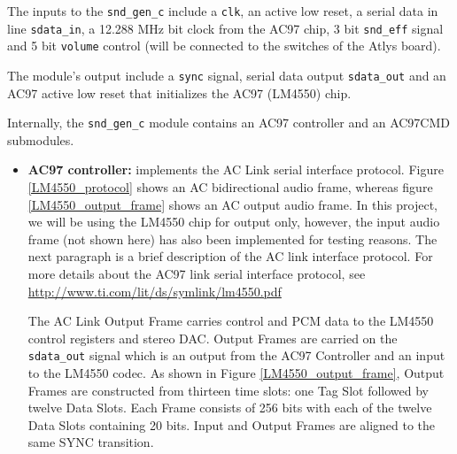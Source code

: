 				The inputs to the \texttt{snd\_gen\_c} include a \texttt{clk}, an active low reset, a serial data in line \texttt{sdata\_in}, a 12.288 MHz bit clock from the AC97 chip, 3 bit \texttt{snd\_eff} signal and 5 bit \texttt{volume} control (will be connected to the switches of the Atlys board).
				
				The module's output include a \texttt{sync} signal, serial data output \texttt{sdata\_out} and an AC97 active low reset that initializes the AC97 (LM4550) chip. 
				
				Internally, the \texttt{snd\_gen\_c} module contains an AC97 controller and an AC97CMD submodules.
				\begin{itemize}
				\item \textbf{AC97 controller:} implements the AC Link serial interface protocol. Figure \ref{LM4550_protocol} shows an AC bidirectional audio frame, whereas figure \ref{LM4550_output_frame} shows an AC output audio frame. In this project, we will be using the LM4550 chip for output only, however, the input audio frame (not shown here) has also been implemented for testing reasons. The next paragraph is a brief description of the AC link interface protocol. For more details about the AC97 link serial interface protocol, see \url{http://www.ti.com/lit/ds/symlink/lm4550.pdf}
				
				The AC Link Output Frame carries control and PCM data to the LM4550 control registers and stereo DAC. Output Frames are carried on the \texttt{sdata\_out} signal which is an output from the AC97 Controller and an input to the LM4550 codec. As shown in Figure \ref{LM4550_output_frame}, Output Frames are constructed from thirteen time slots: one Tag Slot followed by twelve Data Slots. Each Frame consists of 256 bits with each of the twelve Data Slots containing 20 bits. Input and Output Frames are aligned to the same SYNC transition.
					

\end{itemize}
